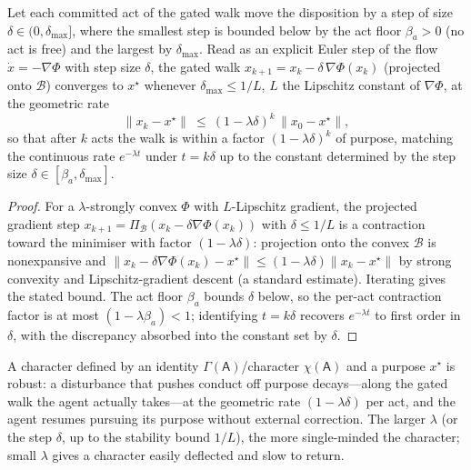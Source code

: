 \documentclass[11pt,twocolumn,a4paper]{article}
\newcommand{\Agent}{\mathsf{A}}
\newcommand{\Self}{\Gamma}          %
\newcommand{\floorc}{\beta}          %
\newcommand{\Char}{\chi}             %
\newcommand{\Beh}{\mathcal{B}}       %
\newcommand{\norm}[1]{\lVert#1\rVert}
\begin{document}
\begin{lemma}
\label{lem:discretise}
Let each committed act of the gated walk move the disposition by a step of
size $\delta\in(0,\delta_{\max}]$, where the smallest step is bounded below
by the act floor $\floorc_a>0$ (no act is free) and the largest by
$\delta_{\max}$. Read as an explicit Euler step of the flow $\dot
x=-\nabla\Phi$ with step size $\delta$, the gated walk
$x_{k+1}=x_k-\delta\,\nabla\Phi(x_k)$ (projected onto $\Beh$) converges to
$x^\star$ whenever $\delta_{\max}\le 1/L$, $L$ the Lipschitz constant of
$\nabla\Phi$, at the geometric rate
\[
\norm{x_k-x^\star}\ \le\ (1-\lambda\delta)^{k}\,\norm{x_0-x^\star},
\]
so that after $k$ acts the walk is within a factor $(1-\lambda\delta)^k$ of
purpose, matching the continuous rate $e^{-\lambda t}$ under $t=k\delta$ up
to the constant determined by the step size $\delta\in[\floorc_a,
\delta_{\max}]$.
\end{lemma}

\begin{proof}
For a $\lambda$-strongly convex $\Phi$ with $L$-Lipschitz gradient, the
projected gradient step $x_{k+1}=\Pi_\Beh(x_k-\delta\nabla\Phi(x_k))$ with
$\delta\le1/L$ is a contraction toward the minimiser with factor
$(1-\lambda\delta)$: projection onto the convex $\Beh$ is nonexpansive and
$\norm{x_k-\delta\nabla\Phi(x_k)-x^\star}\le(1-\lambda\delta)
\norm{x_k-x^\star}$ by strong convexity and Lipschitz-gradient descent
(a standard estimate). Iterating gives the stated bound. The act floor
$\floorc_a$ bounds $\delta$ below, so the per-act contraction factor is at
most $(1-\lambda\floorc_a)<1$; identifying $t=k\delta$ recovers
$e^{-\lambda t}$ to first order in $\delta$, with the discrepancy absorbed
into the constant set by $\delta$.
\end{proof}

\begin{corollary}
\label{cor:robust}
A character defined by an identity $\Self(\Agent)$/character
$\Char(\Agent)$ and a purpose $x^\star$ is robust: a disturbance that
pushes conduct off purpose decays---along the gated walk the agent actually
takes---at the geometric rate $(1-\lambda\delta)$ per act, and the agent
resumes pursuing its purpose without external correction. The larger
$\lambda$ (or the step $\delta$, up to the stability bound $1/L$), the more
single-minded the character; small $\lambda$ gives a character easily
deflected and slow to return.
\end{corollary}
\end{document}
